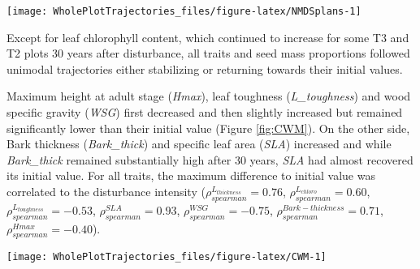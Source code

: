 \documentclass[fleqn,10pt]{ArtEcoFoG} %
\begin{document}
\begin{figure*}

{\centering \texttt{[image: WholePlotTrajectories\_files/figure-latex/NMDSplans-1]} 

}

\caption{Plot trajectories in terms of flora composition (left panels \textbf{(a)} and \textbf{(c)}) and functional composition (right panels \textbf{(b)} and \textbf{(d)}) in a two-dimensional NMDS space. Lower panels (\textbf{(c)} and \textbf{(d)}) represent the euclidean distance to initial condition along the 30 sampled years. Colors are treatments: green (control), blue (T1), orange (T2), red (T3) with shaded areas the credibility intervals}\label{fig:NMDSplans}
\end{figure*}

Except for leaf chlorophyll content, which continued to increase for
some T3 and T2 plots 30 years after disturbance, all traits and seed
mass proportions followed unimodal trajectories either stabilizing or
returning towards their initial values.

Maximum height at adult stage (\emph{Hmax}), leaf toughness
(\emph{L\_toughness}) and wood specific gravity (\emph{WSG}) first
decreased and then slightly increased but remained significantly lower
than their initial value (Figure \ref{fig:CWM}). On the other side, Bark
thickness (\emph{Bark\_thick}) and specific leaf area (\emph{SLA})
increased and while \emph{Bark\_thick} remained substantially high after
30 years, \emph{SLA} had almost recovered its initial value. For all
traits, the maximum difference to initial value was correlated to the
disturbance intensity (\(\rho_{spearman}^{L_{thickness}}=0.76\),
\(\rho_{spearman}^{L_{chloro}}=0.60\),
\(\rho_{spearman}^{L_{toughness}}=-0.53\),
\(\rho_{spearman}^{SLA}=0.93\), \(\rho_{spearman}^{WSG}=-0.75\),
\(\rho_{spearman}^{Bark-thickness}=0.71\),
\(\rho_{spearman}^{Hmax}=-0.40\)).

\begin{figure*}

{\centering \texttt{[image: WholePlotTrajectories\_files/figure-latex/CWM-1]} 

}

\caption{Trajectories of the communities weighted means (CWM) over 30 years after disturbance of 4 leaf traits (Leaf thickness, \emph{L\_thickness}, chlorophyll content, \emph{L\_chloro}, toughness, \emph{L\_toughness} and specific area, \emph{SLA}), 2 stem traits (wood specific gravity, \emph{WSG}, and bark thickness, \emph{Bark-thick}) and one life history trait (Specific maximum height at adult stage, \emph{Hmax}). Colors are treatments: green (control), blue (T1), orange (T2), red (T3) with shaded areas the credibility intervals.}\label{fig:CWM}
\end{figure*}
\end{document}
